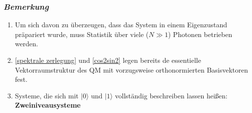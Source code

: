 \subsubsection*{\emph{Bemerkung}}

\begin{enumerate}[(1)]
	\item Um sich davon zu überzeugen, dass das System in einem Eigenzustand präpariert wurde, muss Statistik über viele ($ N \gg 1 $) Photonen betrieben werden.
	\item \eqref{spektrale zerlegung} und \eqref{cos2sin2} legen bereits de essentielle Vektorraumstruktur des QM mit vorzugsweise orthonormierten Basisvektoren fest.
	\item Systeme, die sich mit $ |0\rangle $ und $ |1\rangle $ vollständig beschreiben lassen heißen: \textbf{Zweiniveausysteme}
\end{enumerate}
